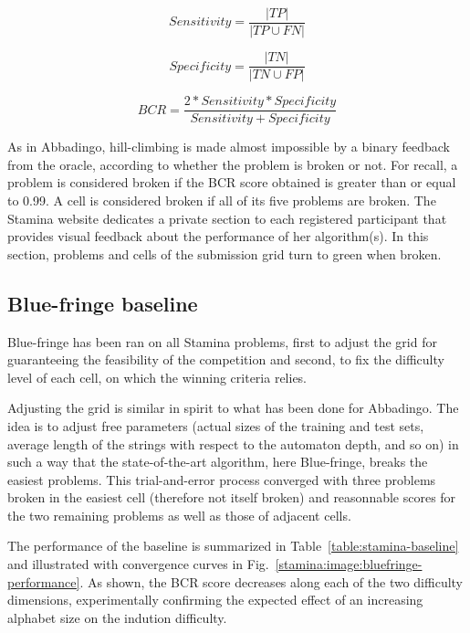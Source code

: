 $$Sensitivity=\frac{|TP|}{|TP \cup FN|}$$ 

$$Specificity=\frac{|TN|}{|TN \cup FP|}$$

$$BCR=\frac{2*Sensitivity*Specificity}{Sensitivity + Specificity}$$

As in Abbadingo, hill-climbing is made almost impossible by a binary feedback from the oracle, according to whether the problem is broken or not. For recall, a problem is considered broken if the BCR score obtained is greater than or equal to 0.99. A cell is considered broken if all of its five problems are broken. The Stamina website dedicates a private section to  each registered participant that provides visual feedback about the performance of her algorithm(s). In this section, problems and cells of the submission grid turn to green when broken.

\subsection{Blue-fringe baseline\label{subsection:stamina-baseline}}

Blue-fringe has been ran on all Stamina problems, first to adjust the grid for guaranteeing the feasibility of the competition and second, to fix the difficulty level of each cell, on which the winning criteria relies.

Adjusting the grid is similar in spirit to what has been done for Abbadingo. The idea is to adjust free parameters (actual sizes of the training and test sets, average length of the strings with respect to the automaton depth, and so on) in such a way that the state-of-the-art algorithm, here Blue-fringe, breaks the easiest problems. This trial-and-error process converged with three problems broken in the easiest cell (therefore not itself broken) and reasonnable scores for the two remaining problems as well as those of adjacent cells.

The performance of the baseline is summarized in Table~\ref{table:stamina-baseline} and illustrated with convergence curves in Fig.~\ref{stamina:image:bluefringe-performance}. As shown, the BCR score decreases along each of the two difficulty dimensions, experimentally confirming the expected effect of an increasing alphabet size on the indution difficulty. 

